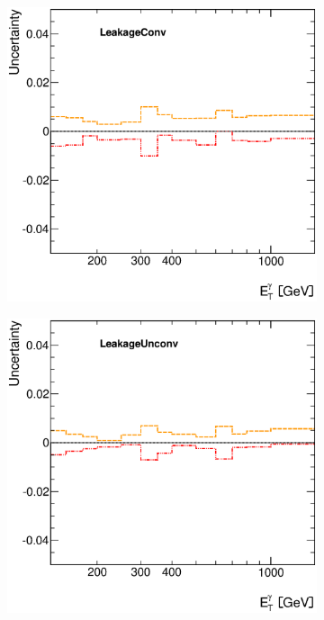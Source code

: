 \documentclass[12pt, twoside]{article}
\numberwithin{equation}{section}
\numberwithin{figure}{section}
\newenvironment{changemargin}[2]{%
\begin{list}{}{%
\setlength{\topsep}{0pt}%
\setlength{\leftmargin}{#1}%
\setlength{\rightmargin}{#2}%
\setlength{\listparindent}{\parindent}%
\setlength{\itemindent}{\parindent}%
\setlength{\parsep}{\parskip}%
}%
\item[]}{\end{list}}
\begin{document}
\begin{figure}[H]
\begin{changemargin}{-1.0cm}{-0.75cm}
\begin{changemargin}{-0.75cm}{-1.0cm}
\begin{subfigure}[b]{0.27\textwidth}
        \end{subfigure}
        \begin{subfigure}[b]{0.27\textwidth}
            \includegraphics[width=\textwidth]{./images/PhotonSystematics/PhotonSystematic-11.eps}
        \end{subfigure}
        \begin{subfigure}[b]{0.27\textwidth}
            \includegraphics[width=\textwidth]{./images/PhotonSystematics/PhotonSystematic-12.eps}
        \end{subfigure}


\end{changemargin}
\end{changemargin}
\end{figure}
\end{document}
